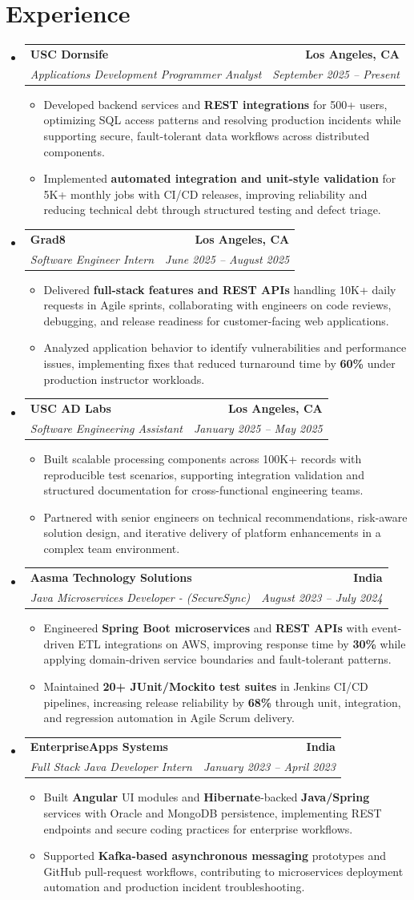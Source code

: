 \documentclass[letterpaper,10pt]{article}
\makeatletter
\newcommand{\resumeItem}[1]{\item\small{{#1 \vspace{-2pt}}}}
\newcommand{\resumeSubheading}[4]{\vspace{-1pt}\item\begin{tabular*}{1.0\textwidth}[t]{l@{\extracolsep{\fill}}r}\textbf{#1} & \textbf{\small #2} \\\textit{\small#3} & \textit{\small #4} \\\end{tabular*}\vspace{-2pt}}
\newcommand{\resumeSubHeadingListStart}{\begin{itemize}[leftmargin=0.0in, label={}]}
\newcommand{\resumeSubHeadingListEnd}{\end{itemize}}
\newcommand{\resumeItemListStart}{\begin{itemize}[leftmargin=0.15in,label=\textbullet,itemsep=2pt,topsep=0pt,parsep=0pt,partopsep=0pt]}
\newcommand{\resumeItemListEnd}{\end{itemize}\vspace{-4pt}}
\makeatother
\begin{document}
\section{Experience}
\resumeSubHeadingListStart
\resumeSubheading{USC Dornsife}{Los Angeles, CA}{Applications Development Programmer Analyst}{September 2025 -- Present}
\resumeItemListStart
\resumeItem{Developed backend services and \textbf{REST integrations} for 500+ users, optimizing SQL access patterns and resolving production incidents while supporting secure, fault-tolerant data workflows across distributed components.}
\resumeItem{Implemented \textbf{automated integration and unit-style validation} for 5K+ monthly jobs with CI/CD releases, improving reliability and reducing technical debt through structured testing and defect triage.}
\resumeItemListEnd
\resumeSubheading{Grad8}{Los Angeles, CA}{Software Engineer Intern}{June 2025 -- August 2025}
\resumeItemListStart
\resumeItem{Delivered \textbf{full-stack features and REST APIs} handling 10K+ daily requests in Agile sprints, collaborating with engineers on code reviews, debugging, and release readiness for customer-facing web applications.}
\resumeItem{Analyzed application behavior to identify vulnerabilities and performance issues, implementing fixes that reduced turnaround time by \textbf{60\%} under production instructor workloads.}
\resumeItemListEnd
\resumeSubheading{USC AD Labs}{Los Angeles, CA}{Software Engineering Assistant}{January 2025 -- May 2025}
\resumeItemListStart
\resumeItem{Built scalable processing components across 100K+ records with reproducible test scenarios, supporting integration validation and structured documentation for cross-functional engineering teams.}
\resumeItem{Partnered with senior engineers on technical recommendations, risk-aware solution design, and iterative delivery of platform enhancements in a complex team environment.}
\resumeItemListEnd
\resumeSubheading{Aasma Technology Solutions}{India}{Java Microservices Developer - (SecureSync)}{August 2023 -- July 2024}
\resumeItemListStart
\resumeItem{Engineered \textbf{Spring Boot microservices} and \textbf{REST APIs} with event-driven ETL integrations on AWS, improving response time by \textbf{30\%} while applying domain-driven service boundaries and fault-tolerant patterns.}
\resumeItem{Maintained \textbf{20+ JUnit/Mockito test suites} in Jenkins CI/CD pipelines, increasing release reliability by \textbf{68\%} through unit, integration, and regression automation in Agile Scrum delivery.}
\resumeItemListEnd
\resumeSubheading{EnterpriseApps Systems}{India}{Full Stack Java Developer Intern}{January 2023 -- April 2023}
\resumeItemListStart
\resumeItem{Built \textbf{Angular} UI modules and \textbf{Hibernate}-backed \textbf{Java/Spring} services with Oracle and MongoDB persistence, implementing REST endpoints and secure coding practices for enterprise workflows.}
\resumeItem{Supported \textbf{Kafka-based asynchronous messaging} prototypes and GitHub pull-request workflows, contributing to microservices deployment automation and production incident troubleshooting.}
\resumeItemListEnd
\resumeSubHeadingListEnd
\vspace{-14pt}
\end{document}
